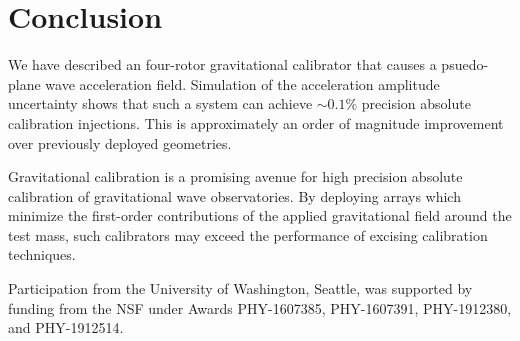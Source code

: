 \documentclass[superscriptaddress, twocolumn, prd]{revtex4-1}
\begin{document}
\section{Conclusion} 
\quad We have described an four-rotor gravitational calibrator that causes a psuedo-plane wave acceleration field. Simulation of the acceleration amplitude uncertainty shows that such a system can achieve $\sim0.1\%$ precision absolute calibration injections. This is approximately an order of magnitude improvement over previously deployed geometries.\cite{ncal} 

Gravitational calibration is a promising avenue for high precision absolute calibration of gravitational wave observatories. By deploying arrays which minimize the first-order contributions of the applied gravitational field around the test mass, such calibrators may exceed the performance of excising calibration techniques.

\begin{acknowledgements}

Participation from the University of Washington, Seattle, was supported by funding from the NSF under Awards PHY-1607385, PHY-1607391, PHY-1912380, and PHY-1912514.

\end{acknowledgements}


 

\end{document}
